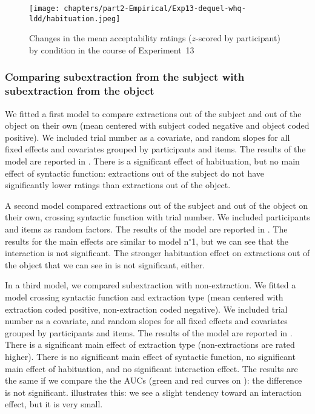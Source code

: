 \begin{figure}
    \centering
    \texttt{[image: chapters/part2-Empirical/Exp13-dequel-whq-ldd/habituation.jpeg]}
    \caption{Changes in the mean acceptability ratings ($z$-scored by participant) by condition in the course of Experiment~13}
    \label{fig:exp13-habituation}
\end{figure}

\subsubsection{Comparing subextraction from the subject with subextraction from the object}

We fitted a first model to compare extractions out of the subject and out of the object on their own (mean centered with subject coded negative and object coded positive). We included trial number as a covariate, and random slopes for all fixed effects and covariates grouped by participants and items. The results of the model are reported in . 
There is a significant effect of habituation, but no main effect of syntactic function: extractions out of the subject do not have significantly lower ratings than extractions out of the object.



A second model compared extractions out of the subject and out of the object on their own, crossing syntactic function with trial number. We included participants and items as random factors. The results of the model are reported in . 
The results for the main effects are similar to model n$^{\circ}$1, but we can see that the interaction is not significant. The stronger habituation effect on extractions out of the object that we can see in  is not significant, either. 



In a third model, we compared subextraction with non-extraction. We fitted a model crossing syntactic function and extraction type (mean centered with extraction coded positive, non-extraction coded negative). We included trial number as a covariate, and random slopes for all fixed effects and covariates grouped by participants and items. The results of the model are reported in . 
There is a significant main effect of extraction type (non-extractions are rated higher). There is no significant main effect of syntactic function, no significant main effect of habituation, and no significant interaction effect. The results are the same if we compare the the AUCs (green and red curves on ): the difference is not significant. 
 illustrates this: we see a slight tendency toward an interaction effect, but it is very small.

